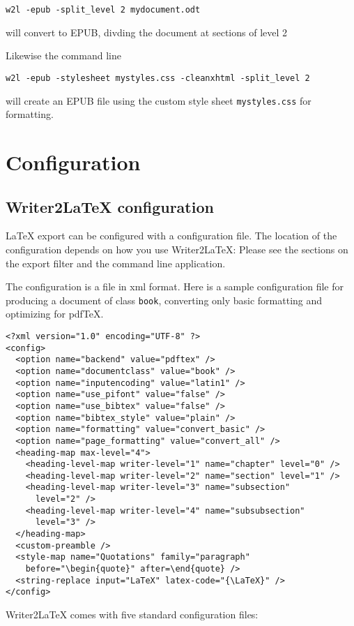 \documentclass{article}
\newcommand\textstyleSourceText[1]{\texttt{\textmd{#1}}}
\begin{document}
\begin{verbatim}
w2l -epub -split_level 2 mydocument.odt
\end{verbatim}
{\mdseries
will convert to EPUB, divding the document at sections of level 2}

{\mdseries
Likewise the command line}

\begin{verbatim}
w2l -epub -stylesheet mystyles.css -cleanxhtml -split_level 2
\end{verbatim}
{\mdseries
will create an EPUB file using the custom style sheet \textstyleSourceText{mystyles.css} for formatting.}

\section{Configuration}
\label{ref:latexconfig}\label{bkm:RefHeading45691948605489}\subsection{Writer2LaTeX configuration}
\label{bkm:RefHeading45711948605489}{\mdseries
LaTeX export can be configured with a configuration file. The location of the configuration depends on how you use Writer2LaTeX: Please see the sections on the export filter and the command line application.}

{\mdseries
The configuration is a file in xml format. Here is a sample configuration file for producing a document of class \textstyleSourceText{book}, converting only basic formatting and optimizing for pdfTeX.}

\begin{verbatim}
<?xml version="1.0" encoding="UTF-8" ?>
<config>
  <option name="backend" value="pdftex" />
  <option name="documentclass" value="book" />
  <option name="inputencoding" value="latin1" />
  <option name="use_pifont" value="false" />
  <option name="use_bibtex" value="false" />
  <option name="bibtex_style" value="plain" />
  <option name="formatting" value="convert_basic" />
  <option name="page_formatting" value="convert_all" />
  <heading-map max-level="4">
    <heading-level-map writer-level="1" name="chapter" level="0" />
    <heading-level-map writer-level="2" name="section" level="1" />
    <heading-level-map writer-level="3" name="subsection"
      level="2" />
    <heading-level-map writer-level="4" name="subsubsection"
      level="3" />
  </heading-map>
  <custom-preamble />
  <style-map name="Quotations" family="paragraph"
    before="\begin{quote}" after=\end{quote} />
  <string-replace input="LaTeX" latex-code="{\LaTeX}" />
</config>
\end{verbatim}
{\mdseries
Writer2LaTeX comes with five standard configuration files:}
\end{document}
